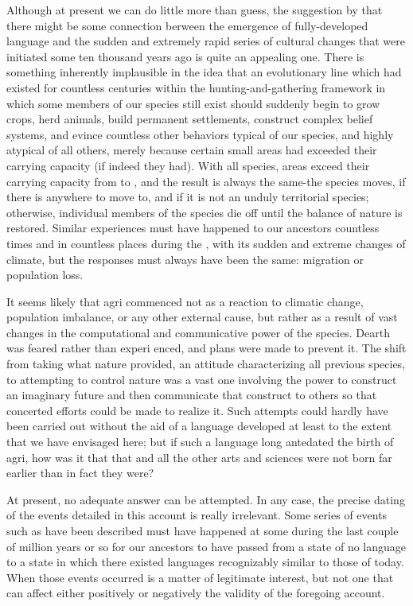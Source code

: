 Although at present we can do little more than guess, the sugges\-tion by \citet{Hockett1973} that there might be some connection berween the emergence of fully-developed language and the sudden and ex\-tremely rapid series of cultural changes that were initiated some ten thousand years ago is quite an appealing one. There is something inherently implausible in the idea that an evolutionary line which had existed for countless centuries within the hunting-and-gathering frame\-work in which some members of our species still exist should suddenly begin to grow crops, herd animals, build permanent settlements, con\-struct complex belief systems, and evince countless other behaviors typical of our species, and highly atypical of all others, merely because certain small areas had exceeded their carrying capacity (if indeed they had). With all species, areas exceed their carrying capacity from  to , and the result is always the same-the species moves, if there is anywhere to move to, and if it is not an unduly territorial species; otherwise, individual members of the species die off until the balance of nature is restored. Similar experiences must have happened to our ancestors countless times and in countless places during the , with its sudden and extreme changes of climate, but the responses must always have been the same: migration or population loss.

It seems likely that agri commenced not as a reaction to climatic change, population imbalance, or any other external cause, but rather as a result of vast changes in the computational and com\-municative power of the species. Dearth was feared rather than experi%
enced, and plans were made to prevent it. The shift from taking what nature provided, an attitude characterizing all previous species, to attempting to control nature was a vast one involving the power to construct an imaginary future and then communicate that construct to others so that concerted efforts could be made to realize it. Such attempts could hardly have been carried out without the aid of a language developed at least to the extent that we have envisaged here; but if such a language long antedated the birth of agri, how was it that that and all the other arts and sciences were not born far earlier than in fact they were?

At present, no adequate answer can be attempted. In any case, the precise dating of the events detailed in this account is really irrele\-vant. Some series of events such as have been described must have happened at some  during the last couple of million years or so for our ancestors to have passed from a state of no language to a state in which there existed languages recognizably similar to those of today. When those events occurred is a matter of legitimate interest, but not one that can affect either positively or negatively the validity of the foregoing account.

